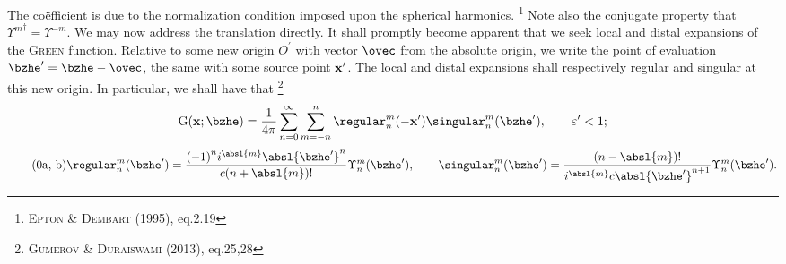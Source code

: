 \noindent
The coëfficient is due to the normalization condition imposed upon the spherical harmonics.%
\footnote{%
  \cite{epton1995multipole} \textsc{Epton} \& \textsc{Dembart} (1995), eq.2.19
}
Note also the conjugate property that ${\Upsilon^m}^{\dag} = \Upsilon^{-m}$.
We may now address the translation directly.
It shall promptly become apparent that we seek local and distal expansions of the \textsc{Green} function.
Relative to some new origin $O^{\prime}$ with vector $\ovec$ from the absolute origin, we write the point of evaluation $\bzhe^{\prime} = \bzhe - \ovec$, the same with some source point $\mathbf{x}^{\prime}$.
The local and distal expansions shall respectively regular and singular at this new origin.
In particular, we shall have that%
\footnote{%
  \cite{gumerov2013efficient} \textsc{Gumerov} \& \textsc{Duraiswami} (2013), eq.25,28
}
%
\begin{equation}
  \green(\xvec; \bzhe) = \frac{1}{4\pi} \sum_{n = 0}^{\infty} \sum_{m = -n}^{n} \regular_{n}^{m}(-\xvec^{\prime}) \singular_{n}^{m}(\bzhe^{\prime}), \qquad
  \varepsilon^{\prime} < 1;
\end{equation}
%
\begin{subequations}
  \begin{equation}\tag{\theequation{a, b}}
    \regular_n^m (\bzhe^{\prime}) = \frac{{(-1)}^n i^{\absl{m}} {\absl{\bzhe^{\prime}}}^n}{c(n + \absl{m})!} \Upsilon_n^m(\bzhe^{\prime}), \qquad
    \singular_n^m(\bzhe^{\prime}) = \frac{(n - \absl{m})!}{i^{\absl{m}} c \absl{\bzhe^{\prime}}^{n+1}} \Upsilon_n^m(\bzhe^{\prime}).
  \end{equation}
\end{subequations}


